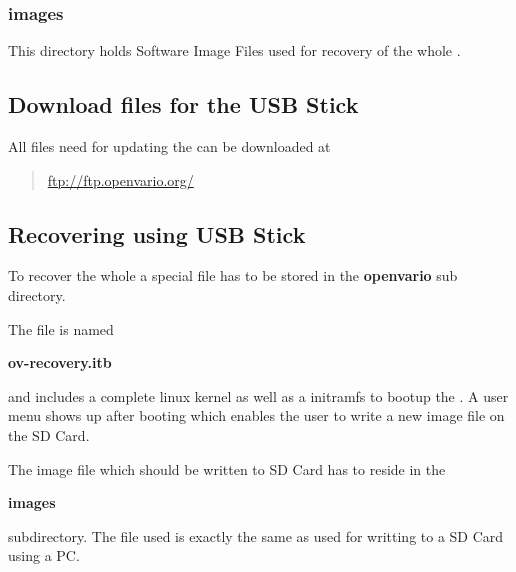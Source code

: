 \subsubsection{images}
This directory holds Software Image Files used for recovery of the whole \ovfc. 

\subsection{Download files for the USB Stick}

All files need for updating the \ovfc can be downloaded at

\begin{quote}
	\url{ftp://ftp.openvario.org/}
\end{quote}


\subsection{Recovering using USB Stick}
To recover the whole \ovfc a special file has to be stored in the \textbf{openvario} sub directory.

The file is named 

\hspace{15mm}\textbf{ov-recovery.itb}

and includes a complete linux kernel as well as a initramfs to bootup the \ovfc.
A user menu shows up after booting which enables the user to write a new image file on the SD Card.

The image file which should be written to SD Card has to reside in the 

\hspace{15mm}\textbf{images}

subdirectory. The file used is exactly the same as used for writting to a SD Card using a PC.




